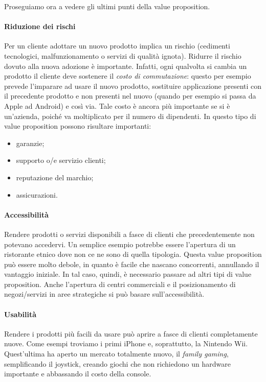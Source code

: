 Proseguiamo ora a vedere gli ultimi punti della value proposition.

\paragraph*{Riduzione dei rischi} Per un cliente adottare un nuovo prodotto
implica un rischio (cedimenti tecnologici, malfunzionamento o servizi di
qualità ignota). Ridurre il rischio dovuto alla nuova adozione è importante.
Infatti, ogni qualvolta si cambia un prodotto il cliente deve sostenere il
\emph{costo di commutazione}: questo per esempio prevede l'imparare ad usare il
nuovo prodotto, sostituire applicazione presenti con il precedente prodotto e
non presenti nel nuovo (quando per esempio si passa da Apple ad Android) e così
via. Tale costo è ancora più importante se si è un'azienda, poiché va
moltiplicato per il numero di dipendenti. In questo tipo di value proposition
possono risultare importanti:
\begin{itemize}
\item garanzie;
\item supporto o/e servizio clienti;
\item reputazione del marchio;
\item assicurazioni.
\end{itemize}

\paragraph*{Accessibilità} Rendere prodotti o servizi disponibili a fasce
di clienti che precedentemente non potevano accedervi. Un semplice esempio
potrebbe essere l'apertura di un ristorante etnico dove non ce ne sono di
quella tipologia. Questa value proposition può essere molto debole, in quanto
è facile che nascano concorrenti, annullando il vantaggio iniziale. In tal
caso, quindi, è necessario passare ad altri tipi di value proposition.
Anche l'apertura di centri commerciali e il posizionamento di negozi/servizi in
aree strategiche si può basare sull'accessibilità.

\paragraph*{Usabilità} Rendere i prodotti più facili da usare può aprire a
fasce di clienti completamente nuove. Come esempi troviamo i primi iPhone e,
soprattutto, la Nintendo Wii. Quest'ultima ha aperto un mercato totalmente
nuovo, il \emph{family gaming}, semplificando il joystick, creando giochi
che non richiedono un hardware importante e abbassando il costo della
console.

